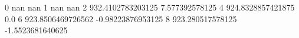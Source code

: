 0 nan nan
1 nan nan
2 932.4102783203125 7.577392578125
4 924.8328857421875 0.0
6 923.8506469726562 -0.98223876953125
8 923.280517578125 -1.5523681640625
